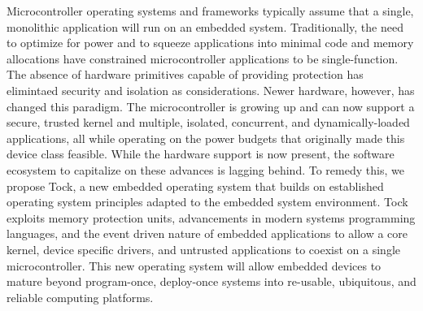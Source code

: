 

Microcontroller operating systems and frameworks typically assume that a single,
monolithic application will run on an embedded system.
Traditionally, the need to optimize for power and to squeeze applications into
minimal code and memory allocations have constrained microcontroller
applications to be single-function.
The absence of hardware primitives capable of providing protection has
elimintaed security and isolation as considerations.
Newer hardware, however, has changed this paradigm.
The microcontroller is growing up and can now support a secure, trusted kernel
and multiple, isolated, concurrent, and dynamically-loaded applications, all
while operating on the power budgets that originally made this device class
feasible.
While the hardware support is now present, the software ecosystem to
capitalize on these advances is lagging behind.
To remedy this, we propose Tock, a new embedded operating system that builds
on established operating system principles adapted to the embedded system
environment.
Tock exploits memory protection units, advancements in modern systems
programming languages, and the event driven nature of embedded applications to
allow a core kernel, device specific drivers, and untrusted applications to
coexist on a single microcontroller.
This new operating system will allow embedded devices to mature beyond
program-once, deploy-once systems into re-usable, ubiquitous, and reliable
computing platforms.





